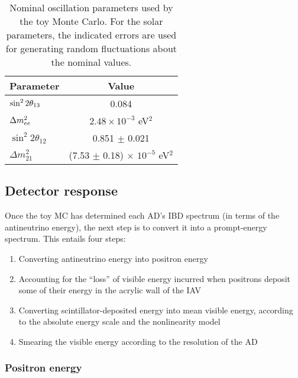 \documentclass[../thesis.tex]{subfiles}
\begin{document}
\begin{table}[ht]
  \begin{tabular}{lc}
    \toprule
    Parameter & Value \\
    \midrule
    $\sin^2 2\theta_{13}$ & 0.084 \\
    $\Delta m^2_{ee}$ & $2.48 \times 10^{-3}$ eV$^2$ \\
    $\sin^2 2\theta_{12}$ & 0.851 $\pm$ 0.021\\
    $\Delta m^2_{21}$ & (7.53 $\pm$ 0.18) $\times$ $10^{-5}$ eV$^2$ \\
    \bottomrule
  \end{tabular}
  \caption{Nominal oscillation parameters used by the toy Monte Carlo. For the solar parameters, the indicated errors are used for generating random fluctuations about the nominal values.}
  \label{tab:toyNomOscPars}
\end{table}

\subsection{Detector response}
\label{sec:fitToyDetResponse}

Once the toy MC has determined each AD's IBD spectrum (in terms of the antineutrino energy), the next step is to convert it into a prompt-energy spectrum. This entails four steps:

\begin{enumerate}
\item Converting antineutrino energy into positron energy
\item Accounting for the ``loss'' of visible energy incurred when positrons deposit some of their energy in the acrylic wall of the IAV
\item Converting scintillator-deposited energy into mean visible energy, according to the absolute energy scale and the nonlinearity model
\item Smearing the visible energy according to the resolution of the AD
\end{enumerate}

\subsubsection{Positron energy}
\end{document}
